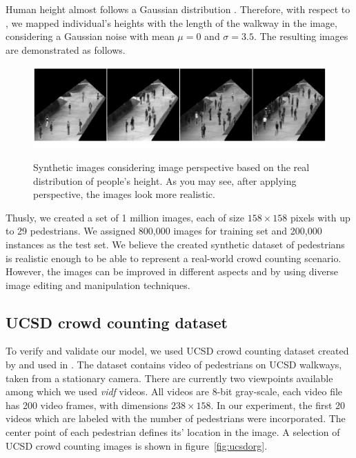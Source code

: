 \begin{itemize}
Human height almost follows a Gaussian distribution \cite{subramanian2011height}. Therefore, with respect to \cite{subramanian2011height, garcia2007evolution}, we mapped individual's heights with the length of the walkway in the image, considering a Gaussian noise with mean $\mu = 0$ and $\sigma = 3.5$. The resulting images are demonstrated as follows.

\begin{figure}[H]
	\centering
	{\includegraphics[width=1\textwidth]{images/pers}}
	\caption{Synthetic images considering image perspective based on the real distribution of people's height. As you may see, after applying perspective, the images look more realistic. }
	\label{fig:pers}
\end{figure}


\end{itemize}

\noindent Thusly, we created a set of 1 million images, each of size $158\times158$ pixels with up to 29 pedestrians. We assigned 800,000 images for training set and 200,000 instances as the test set. We believe the created synthetic dataset of pedestrians is realistic enough to be able to represent a real-world crowd counting scenario. However, the images can be improved in different aspects and by using diverse image editing and manipulation techniques. 

\subsection{UCSD crowd counting dataset}
\label{subsec:datareal2}
To verify and validate our model, we used UCSD crowd counting dataset created by \citeauthor*{chan2008privacy} and used in \cite{chan2008privacy,chan2009bayesian,chan2012counting}. The dataset contains video of pedestrians on UCSD walkways, taken from a stationary camera. There are currently two  viewpoints available among which we used \textit{vidf} videos. All videos are 8-bit gray-scale, each video file has 200 video frames, with dimensions $238\times158$. In our experiment, the first 20 videos which are labeled with the number of pedestrians were incorporated. The center point of each pedestrian defines its' location in the image. A selection of UCSD crowd counting images is shown in figure~\ref{fig:ucsdorg}.

